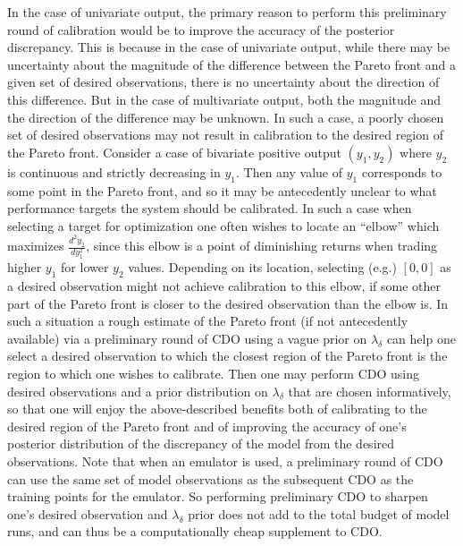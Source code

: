 \documentclass[12pt]{article}
\begin{document}
In the case of univariate output, the primary reason to perform this preliminary round of calibration would be to improve the accuracy of the posterior discrepancy. 
%
This is because in the case of univariate output, while there may be uncertainty about the magnitude of the difference between the Pareto front and a given set of desired observations, there is no uncertainty about the direction of this difference.
%
But in the case of multivariate output, both the magnitude and the direction of the difference may be unknown.
%
In such a case, a poorly chosen set of desired observations may not result in calibration to the desired region of the Pareto front.
%
Consider a case of bivariate positive output $(y_1,y_2)$ where $y_2$ is continuous and strictly decreasing in $y_1$. 
%
Then any value of $y_1$ corresponds to some point in the Pareto front, and so it may be antecedently unclear to what performance targets the system should be calibrated.
%
In such a case when selecting a target for optimization one often wishes to locate an ``elbow'' which maximizes $\frac{d^2 y_2}{dy_1^2}$, 
since this elbow is a point of diminishing returns when trading higher $y_1$ for lower $y_2$ values.
%
Depending on its location, selecting (e.g.) $[0,0]$ as a desired observation might not achieve calibration to this elbow, if some other part of the Pareto front is closer to the desired observation than the elbow is.
%
In such a situation a rough estimate of the Pareto front (if not antecedently available) via a preliminary round of CDO using a vague prior on $\lambda_\delta$ can help one select a desired observation to which the closest region of the Pareto front is the region to which one wishes to calibrate.
%
Then one may perform CDO using desired observations and a prior distribution on $\lambda_\delta$ that are chosen informatively, so that one will enjoy the above-described benefits both of calibrating to the desired region of the Pareto front and of improving the accuracy of one's posterior distribution of the discrepancy of the model from the desired observations.
%
Note that when an emulator is used, a preliminary round of CDO can use the same set of model observations as the subsequent CDO as the training points for the emulator.
%
So performing preliminary CDO to sharpen one's desired observation and $\lambda_\delta$ prior does not add to the total budget of model runs, and can thus be a computationally cheap supplement to CDO.
\end{document}
